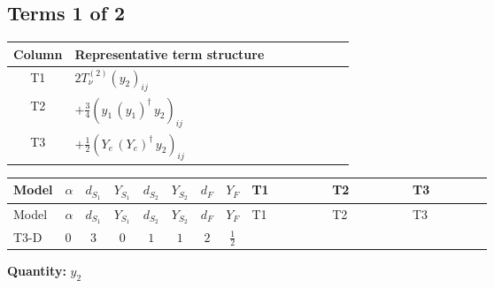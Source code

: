 \documentclass[8pt]{article}
\begin{document}
\begin{landscape}
\subsection*{Terms 1 of 2}
\begin{center}
\begin{tabular}{@{}c >{\raggedright\arraybackslash}p{0.82\linewidth}@{}}
\toprule
Column & Representative term structure \\
\midrule
T1 & \(\displaystyle 2 T_{\nu}^{(2)} \left({y_2}\right)_{ij}\) \\
\midrule
T2 & \(\displaystyle +\frac{3}{4} \left({y_1}\,\left({y_1}\right)^{\dagger}\,{y_2}\right)_{ij}\) \\
\midrule
T3 & \(\displaystyle +\frac{1}{2} \left({Y_e}\,\left({Y_e}\right)^{\dagger}\,{y_2}\right)_{ij}\) \\
\midrule
\bottomrule
\end{tabular}
\end{center}
\smallskip
\tiny
\begin{longtable}{@{}llcccccc >{\raggedright\arraybackslash}p{0.21\linewidth} >{\raggedright\arraybackslash}p{0.21\linewidth} >{\raggedright\arraybackslash}p{0.21\linewidth}@{}}
\toprule
Model & $\alpha$ & $d_{S_1}$ & $Y_{S_1}$ & $d_{S_2}$ & $Y_{S_2}$ & $d_F$ & $Y_F$ & T1 & T2 & T3 \\
\midrule
\endfirsthead
\toprule
Model & $\alpha$ & $d_{S_1}$ & $Y_{S_1}$ & $d_{S_2}$ & $Y_{S_2}$ & $d_F$ & $Y_F$ & T1 & T2 & T3 \\
\midrule
\endhead
T3-D & $0$ & $3$ & $0$ & $1$ & $1$ & $2$ & $\frac{1}{2}$ & \scriptsize\adjustbox{max width=\linewidth}{$\begin{gathered} 2 T_{\nu}^{(2)} \left({y_2}\right)_{ij}\end{gathered}$} & \scriptsize\adjustbox{max width=\linewidth}{$\begin{gathered} +\frac{3}{4} \left({y_1}\,\left({y_1}\right)^{\dagger}\,{y_2}\right)_{ij}\end{gathered}$} & \scriptsize\adjustbox{max width=\linewidth}{$\begin{gathered} +\frac{1}{2} \left({Y_e}\,\left({Y_e}\right)^{\dagger}\,{y_2}\right)_{ij}\end{gathered}$} \\
\midrule
\bottomrule
\end{longtable}
\clearpage
\noindent\textbf{Quantity: }$y_2$\par\smallskip

\end{landscape}
\end{document}

